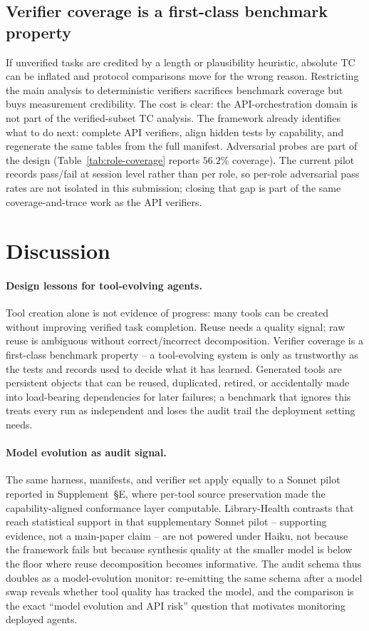\documentclass[sigconf,anonymous,review,natbib=false]{acmart}
\begin{document}
\subsection{Verifier coverage is a first-class benchmark property}

If unverified tasks are credited by a length or plausibility heuristic, absolute TC can be inflated and protocol comparisons move for the wrong reason. Restricting the main analysis to deterministic verifiers sacrifices benchmark coverage but buys measurement credibility. The cost is clear: the API-orchestration domain is not part of the verified-subset TC analysis. The framework already identifies what to do next: complete API verifiers, align hidden tests by capability, and regenerate the same tables from the full manifest. Adversarial probes are part of the design (Table~\ref{tab:role-coverage} reports $56.2$\% coverage). The current pilot records pass/fail at session level rather than per role, so per-role adversarial pass rates are not isolated in this submission; closing that gap is part of the same coverage-and-trace work as the API verifiers.

\section{Discussion}

\paragraph{Design lessons for tool-evolving agents.}
Tool creation alone is not evidence of progress: many tools can be created without improving verified task completion. Reuse needs a quality signal; raw reuse is ambiguous without correct/incorrect decomposition. Verifier coverage is a first-class benchmark property -- a tool-evolving system is only as trustworthy as the tests and records used to decide what it has learned. Generated tools are persistent objects that can be reused, duplicated, retired, or accidentally made into load-bearing dependencies for later failures; a benchmark that ignores this treats every run as independent and loses the audit trail the deployment setting needs.

\paragraph{Model evolution as audit signal.}
\label{sec:model-evo}
The same harness, manifests, and verifier set apply equally to a Sonnet pilot reported in Supplement~\S E, where per-tool source preservation made the capability-aligned conformance layer computable. Library-Health contrasts that reach statistical support in that supplementary Sonnet pilot -- supporting evidence, not a main-paper claim -- are not powered under Haiku, not because the framework fails but because synthesis quality at the smaller model is below the floor where reuse decomposition becomes informative. The audit schema thus doubles as a model-evolution monitor: re-emitting the same schema after a model swap reveals whether tool quality has tracked the model, and the comparison is the exact ``model evolution and API risk'' question that motivates monitoring deployed agents.
\end{document}
